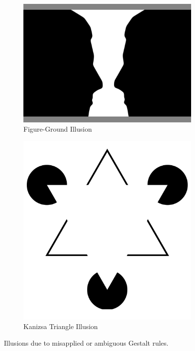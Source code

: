 \documentclass[11pt]{isuthesis}\usepackage[]{graphicx}\usepackage[]{color}
\begin{document}
\begin{figure}[htbp]\centering
\hfil
\begin{subfigure}[b]{.4\textwidth}\centering\vspace{.5cm}
  \includegraphics[width=\textwidth]{FigureVase}\vspace{1cm}
  \caption{Figure-Ground Illusion}
\end{subfigure}\hfill
\begin{subfigure}[b]{.4\textwidth}\centering
  \includegraphics[width=\textwidth]{IllusoryContour}
  \caption{Kanizsa Triangle Illusion}
\end{subfigure}\hfil
\caption[Gestalt Illusions]{Illusions due to misapplied or ambiguous Gestalt rules.}\label{fig:GestaltIllusions}
\end{figure}
\end{document}
